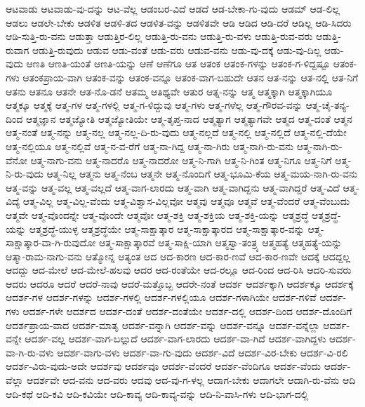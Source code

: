 {ಆಟವಾಡು
ಆಟವಾಡು-ವು-ದನ್ನು
ಆಟ-ವೆಲ್ಲ
ಆಡಂಬರ-ವಿದೆ
ಆಡದೆ
ಆಡ-ಬೇಕಾ-ಗು-ವುದು
ಆಡಮ್
ಆಡ-ಲಿಲ್ಲ
ಆಡಲು
ಆಡಲೇ-ಬೇಕು
ಆಡಳಿತ
ಆಡಳಿ-ತದ
ಆಡಳಿತ-ವನ್ನು
ಆಡಳಿತವೇ
ಆಡಿ
ಆಡಿದ
ಆಡಿ-ದರೆ
ಆಡಿಲ್ಲ
ಆಡಿ-ಸಿದರು
ಆಡಿ-ಸುತ್ತಿ-ರು-ವನು
ಆಡುತ್ತಾ
ಆಡುತ್ತಿರ-ಲಿಲ್ಲ
ಆಡುತ್ತಿ-ರು-ವನು
ಆಡುತ್ತಿ-ರು-ವಳು
ಆಡುತ್ತಿ-ರುವ-ವರು
ಆಡುತ್ತಿ-ರುವಾಗ
ಆಡುತ್ತಿ-ರುವುದು
ಆಡುವ
ಆಡು-ವಂತೆ
ಆಡು-ವರು
ಆಡುವ-ವನು
ಆಡು-ವು-ದಕ್ಕೆ
ಆಡು-ವು-ದಿಲ್ಲ
ಆಡು-ವುದು
ಆಣತಿ
ಆಣತಿ-ಯಂತೆ
ಆಣತಿ-ಯನ್ನು
ಆಣೆ
ಆಣೆಗೂ
ಆತ
ಆತಂಕ
ಆತಂಕ-ಗಳನ್ನು
ಆತಂಕ-ಗ-ಳಿದ್ದಷ್ಟೂ
ಆತಂಕ-ಗಳು
ಆತಂಕಪ್ರಾಯ-ವಾಗಿ
ಆತಂಕ-ವನ್ನು
ಆತಂಕ-ವನ್ನೂ
ಆತಂಕ-ವಾಗ-ಬಹುದೇ
ಆತನ
ಆತ-ನನ್ನು
ಆತ-ನಲ್ಲಿ
ಆತ-ನಿಗೆ
ಆತನು
ಆತನೂ
ಆತನೇ
ಆತ-ನೊ-ಡನೆ
ಆತಮ್ಮ
ಆತಿಥ್ಯವೇ
ಆತುರ
ಆತ್ನ-ನನ್ನು
ಆತ್ಮ
ಆತ್ಮಕ್ಕಾಗಿ
ಆತ್ಮಕ್ಕಾಗಿಯೂ
ಆತ್ಮಕ್ಕೂ
ಆತ್ಮಕ್ಕೆ
ಆತ್ಮ-ಗಳ
ಆತ್ಮ-ಗಳಲ್ಲಿ
ಆತ್ಮ-ಗ-ಳಿದ್ದುವು
ಆತ್ಮ-ಗಳು
ಆತ್ಮ-ಗಳೆಲ್ಲ
ಆತ್ಮ-ಗೌರವ-ವನ್ನು
ಆತ್ಮ-ಚೈ-ತನ್ಯ-ದಿಂದ
ಆತ್ಮಜ್ಞಾನ
ಆತ್ಮಜ್ಯೋತಿ
ಆತ್ಮಜ್ಯೋತಿಯೇ
ಆತ್ಮ-ತೃಪ್ತ-ನಾದ
ಆತ್ಮತ್ಯಾಗ
ಆತ್ಮತ್ಯಾಗವೇ
ಆತ್ಮದ
ಆತ್ಮ-ದಂತೆ
ಆತ್ಮನ
ಆತ್ಮ-ನಂತೆ
ಆತ್ಮ-ನನ್ನು
ಆತ್ಮ-ನಲ್ಲ
ಆತ್ಮ-ನಲ್ಲ-ದಿ-ರು-ವುದು
ಆತ್ಮ-ನಲ್ಲದೆ
ಆತ್ಮ-ನಲ್ಲಿ
ಆತ್ಮ-ನಲ್ಲಿದೆ
ಆತ್ಮ-ನಲ್ಲಿ-ದೆಯೇ
ಆತ್ಮ-ನಲ್ಲಿಯೂ
ಆತ್ಮ-ನಲ್ಲಿವೆ
ಆತ್ಮ-ನ-ವ-ರೆಗೆ
ಆತ್ಮ-ನಾ-ಗಿದ್ದ
ಆತ್ಮ-ನಾ-ಗಿರು
ಆತ್ಮ-ನಾಗಿ-ರು-ವನು
ಆತ್ಮ-ನಾಗಿ-ರು-ವೆನೋ
ಆತ್ಮ-ನಾಗು-ವನು
ಆತ್ಮ-ನಾದರೊ
ಆತ್ಮ-ನಾದರೋ
ಆತ್ಮ-ನಿ-ಗಾಗಿ
ಆತ್ಮ-ನಿ-ಗಿಂತ
ಆತ್ಮ-ನಿಗೂ
ಆತ್ಮ-ನಿಗೆ
ಆತ್ಮ-ನಿ-ರು-ವುದು
ಆತ್ಮ-ನಿಲ್ಲ
ಆತ್ಮನು
ಆತ್ಮ-ನೆಂಬ
ಆತ್ಮನೇ
ಆತ್ಮ-ನೊಂದಿಗೆ
ಆತ್ಮ-ಭೂಮಿ-ಕೆಯ
ಆತ್ಮ-ಮಯ-ನಾಗಿ-ರು-ವನು
ಆತ್ಮ-ವನ್ನು
ಆತ್ಮ-ವಲ್ಲ
ಆತ್ಮ-ವಲ್ಲದೆ
ಆತ್ಮ-ವಾಗ-ಲಾರದು
ಆತ್ಮ-ವಾಗಿ
ಆತ್ಮ-ವಾಗಿದ್ದನು
ಆತ್ಮ-ವಾಗಿದ್ದರೆ
ಆತ್ಮ-ವಿದೆ
ಆತ್ಮ-ವಿದ್ಯೆ
ಆತ್ಮ-ವಿಲ್ಲ
ಆತ್ಮ-ವಿಲ್ಲ-ವೆಂದು
ಆತ್ಮ-ವಿಶ್ವಾಸ-ವಿಲ್ಲವೋ
ಆತ್ಮವು
ಆತ್ಮವೂ
ಆತ್ಮವೆ
ಆತ್ಮ-ವೆಂದರೆ
ಆತ್ಮ-ವೆಂಬುದು
ಆತ್ಮವೇ
ಆತ್ಮ-ವೊಂದನ್ನೇ
ಆತ್ಮ-ವೊಂದೇ
ಆತ್ಮವೋ
ಆತ್ಮ-ಶಕ್ತಿ
ಆತ್ಮ-ಶಕ್ತಿಯ
ಆತ್ಮ-ಶಕ್ತಿ-ಯನ್ನು
ಆತ್ಮಶ್ರದ್ಧೆ
ಆತ್ಮಶ್ರದ್ಧೆ-ಯನ್ನು
ಆತ್ಮಶ್ರದ್ಧೆ-ಯುಳ್ಳ
ಆತ್ಮಶ್ರದ್ಧೆಯೇ
ಆತ್ಮ-ಸಾಕ್ಷಾತ್ಕಾರ
ಆತ್ಮ-ಸಾಕ್ಷಾತ್ಕಾರದ
ಆತ್ಮ-ಸಾಕ್ಷಾತ್ಕಾರ-ವನ್ನು
ಆತ್ಮ-ಸಾಕ್ಷಾತ್ಕಾರ-ವಾ-ಗಿ-ರುವುದೋ
ಆತ್ಮ-ಸಾಕ್ಷಾತ್ಕಾರವೆ
ಆತ್ಮ-ಸಾಕ್ಷಿ-ಯಾಗಿ
ಆತ್ಮಸ್ವಾ-ತಂತ್ರ್ಯ
ಆತ್ಮಹತ್ಯೆ
ಆತ್ಮಹತ್ಯೆ-ಯನ್ನು
ಆತ್ಮಾ-ರಾಮ-ನಾಗು-ವನು
ಆತ್ಮೋನ್ನ
ಆತ್ಯಂತ
ಆದ
ಆದ-ಕಾರಣ
ಆದ-ಕಾರ-ಣವೆ
ಆದ-ಕಾರ-ಣವೇ
ಆದಕ್ಕೆ
ಆದದ್ದಲ್ಲ
ಆದದ್ದು
ಆದ-ಮೇಲೆ
ಆದ-ಮೇಲೆ-ಹಲವು
ಆದರ
ಆದ-ರಂತೆಯೇ
ಆದ-ರಲ್ಲೂ
ಆದ-ರಿಂದ
ಆದ-ರಿಸಿ
ಆದರಿ-ಸುವರು
ಆದರು
ಆದರೂ
ಆದರೆ
ಆದರೆ-ನಾವು
ಆದರೆ-ಮತ್ತೊಬ್ಬ
ಆದರೇ-ನಂತೆ
ಆದರ್ಶ
ಆದರ್ಶಕ್ಕಾಗಿ
ಆದರ್ಶಕ್ಕೂ
ಆದರ್ಶಕ್ಕೆ
ಆದರ್ಶ-ಗಳ
ಆದರ್ಶ-ಗಳನ್ನು
ಆದರ್ಶ-ಗಳಲ್ಲಿ
ಆದರ್ಶ-ಗಳಲ್ಲಿಯೂ
ಆದರ್ಶ-ಗಳಾಗಿಯೇ
ಆದರ್ಶ-ಗಳಿವೆ
ಆದರ್ಶ-ಗಳು
ಆದರ್ಶ-ಗಳೇ
ಆದರ್ಶದ
ಆದರ್ಶ-ದಂತೆ
ಆದರ್ಶ-ದಂತೆಯೇ
ಆದರ್ಶ-ದಲ್ಲಿ
ಆದರ್ಶ-ದಿಂದ
ಆದರ್ಶ-ದೊಂದಿಗೆ
ಆದರ್ಶಪ್ರಾಯ-ವಾದ
ಆದರ್ಶ-ಮಾತೃ
ಆದರ್ಶ-ವನ್ನಾಗಿ
ಆದರ್ಶ-ವನ್ನು
ಆದರ್ಶ-ವನ್ನೂ
ಆದರ್ಶ-ವನ್ನೆಲ್ಲಾ
ಆದರ್ಶ-ವನ್ನೇ
ಆದರ್ಶ-ವಲ್ಲ
ಆದರ್ಶ-ವಾಗ-ಬಲ್ಲುದೆ
ಆದರ್ಶ-ವಾಗ-ಲಾರದು
ಆದರ್ಶ-ವಾ-ಗಿದೆ
ಆದರ್ಶ-ವಾಗಿದ್ದಳು
ಆದರ್ಶ-ವಾ-ಗಿ-ರು-ವಳು
ಆದರ್ಶ-ವಾಗು-ವಳು
ಆದರ್ಶ-ವಾ-ಗು-ವುದು
ಆದರ್ಶ-ವಿದೆ
ಆದರ್ಶ-ವಿರ-ಬೇಕು
ಆದರ್ಶ-ವಿ-ರಲಿ
ಆದರ್ಶ-ವಿರು-ವುದು-ಅದೇ
ಆದರ್ಶವು
ಆದರ್ಶವೂ
ಆದರ್ಶ-ವೆಂದರೆ
ಆದರ್ಶ-ವೆಂದಿಗೂ
ಆದರ್ಶ-ವೆಂದು
ಆದರ್ಶ-ವೆಲ್ಲಾ
ಆದರ್ಶವೇ
ಆದ-ವನು
ಆದ-ವರು
ಆದವು
ಆದ-ವು-ಗ-ಳಲ್ಲ
ಆದಾಗ-ಬೇಕು
ಆದಾಗಲೇ
ಆದಾಗಿ-ರು-ವೆನು
ಆದಿ
ಆದಿ-ಕಥೆ
ಆದಿ-ಕವಿ
ಆದಿ-ಕವಿಯೇ
ಆದಿ-ಕಾವ್ಯ
ಆದಿ-ಕಾವ್ಯ-ವನ್ನು
ಆದಿ-ನಿ-ವಾಸಿ-ಗಳು
ಆದಿ-ಭಾಗ-ದಲ್ಲಿ
}
